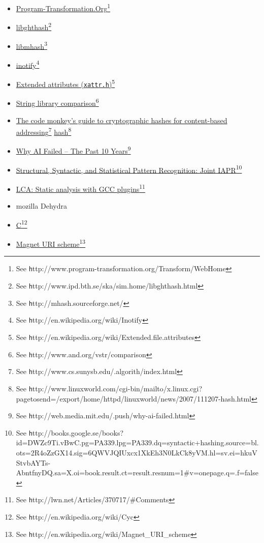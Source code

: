 \documentclass[a4paper,10pt,twocolumn]{article}
\newcommand{\hrefn}[2]{\href{#1}{#2}\footnote{See {\texttt #1}}} %
\begin{document}
\begin{itemize}
\item \hrefn{http://www.program-transformation.org/Transform/WebHome}{Program-Transformation.Org}
\item \hrefn{http://www.ipd.bth.se/ska/sim.home/libghthash.html}{libghthash}
\item \hrefn{http://mhash.sourceforge.net/}{libmhash}
\item \hrefn{http://en.wikipedia.org/wiki/Inotify}{inotify}
\item \hrefn{http://en.wikipedia.org/wiki/Extended.file.attributes}{Extended attributes (\texttt{xattr.h})}
\item \hrefn{http://www.and.org/vstr/comparison}{String library comparison}
\item \hrefn{http://www.cs.sunysb.edu/.algorith/index.html}{The code
    monkey's guide to cryptographic hashes for content-based addressing}
  \hrefn{http://www.linuxworld.com/cgi-bin/mailto/x.linux.cgi?pagetosend=/export/home/httpd/linuxworld/news/2007/111207-hash.html}{hash}
\item \hrefn{http://web.media.mit.edu/.push/why-ai-failed.html}{Why AI Failed -- The Past 10 Years}
\item \hrefn{http://books.google.se/books?id=DWZc9Ti.vBwC.pg=PA339.lpg=PA339.dq=syntactic+hashing.source=bl.ots=2R4oZzGX14.sig=6QWVJQIUxcx1XkEh3N0LkCk8yVM.hl=sv.ei=hkuVStvbAYTs-AbntfnyDQ.sa=X.oi=book.result.ct=result.resnum=1\#v=onepage.q=.f=false}{Structural,
    Syntactic, and Statistical Pattern Recognition: Joint IAPR}
\item \hrefn{http://lwn.net/Articles/370717/\#Comments}{LCA: Static analysis with GCC plugins}
\item mozilla Dehydra
\item \hrefn{http://en.wikipedia.org/wiki/Cyc}{C}
\item \hrefn{http://en.wikipedia.org/wiki/Magnet\_URI\_scheme}{Magnet URI scheme}

\end{itemize}

\end{document}
